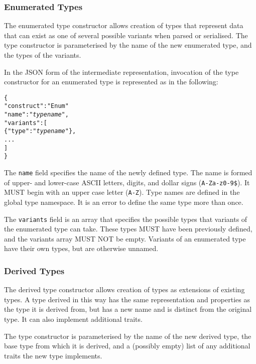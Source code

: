 \documentclass[10pt,twocolumn,a4paper]{article}
\newcommand{\code}[1]{\texttt{#1}}
\begin{document}
\subsubsection{Enumerated Types}

The enumerated type constructor allows creation of types that represent
data that can exist as one of several possible variants when parsed or
serialised. The type constructor is parameterised by the name of the new
enumerated type, and the types of the variants.

In the JSON form of the intermediate representation, invocation of the type
constructor for an enumerated type is represented as in the following:
\footnotesize
\begin{alltt}
  \{
    "construct"   : "Enum"
    "name"        : "\emph{type name}",
    "variants"    : [
      \{"type" : "\emph{type name}"\},
      ...
    ]
  \}
\end{alltt}
\normalsize
The \code{name} field specifies the name of the newly defined type. The
name is formed of upper- and lower-case ASCII letters, digits, and dollar
signs (\code{A-Za-z0-9\$}).  It MUST begin with an upper case letter
(\code{A-Z}). Type names are defined in the global type namespace.
It is an error to define the same type more than once.

The \code{variants} field is an array that specifies the possible types
that variants of the enumerated type can take. These types MUST have been
previously defined, and the variants array MUST NOT be empty. Variants of
an enumerated type have their own types, but are otherwise unnamed.

\subsubsection{Derived Types}

The derived type constructor allows creation of types as extensions of
existing types. A type derived in this way has the same representation
and properties as the type it is derived from, but has a new name and is
distinct from the original type. It can also implement additional traits.

The type constructor is parameterised by the name of the new derived type,
the base type from which it is derived, and a (possibly empty) list of any
additional traits the new type implements.
\end{document}
